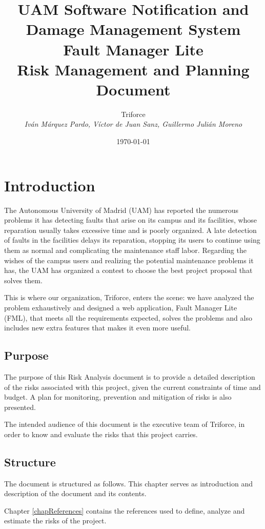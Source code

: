 \documentclass[11pt]{report}
\title{UAM Software Notification and Damage Management System \\ Fault Manager Lite \\ Risk Management and Planning Document}
\date{\today}
\author{{\Large Triforce} \\ \vspace{5pt} \textit{Iván Márquez Pardo, Víctor de Juan Sanz, Guillermo Julián Moreno}}
\newcounter{risks}[subsection]
\begin{document}
\maketitle
\tableofcontents
\newpage
\chapter{Introduction}


\label{chapIntroduction}

The Autonomous University of Madrid (UAM) has reported the numerous problems it has detecting faults that arise on its campus and its facilities, whose reparation usually takes excessive time and is poorly organized. A late detection of faults in the facilities delays its reparation, stopping its users to continue using them as normal and complicating the maintenance staff labor. Regarding the wishes of the campus users and realizing the potential maintenance problems it has, the UAM has organized a contest to choose the best project proposal that solves them.

This is where our organization, Triforce, enters the scene: we have analyzed the problem exhaustively and designed a web application, Fault Manager Lite (FML), that meets all the requirements expected, solves the problems and also includes new extra features that makes it even more useful.

\section{Purpose}

The purpose of this Risk Analysis document is to provide a detailed description of the risks associated with this project, given the current constraints of time and budget. A plan for monitoring, prevention and mitigation of risks is also presented.

The intended audience of this document is the executive team of Triforce, in order to know and evaluate the risks that this project carries.

\section{Structure}

The document is structured as follows. This chapter serves as introduction and description of the document and its contents.

Chapter \ref{chapReferences} contains the references used to define, analyze and estimate the risks of the project.
\end{document}
